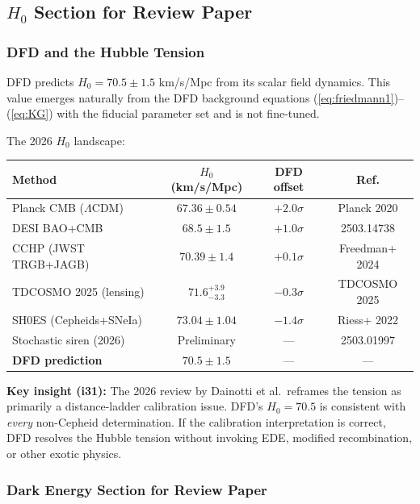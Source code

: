 \documentclass[11pt,a4paper]{article}
\begin{document}
\subsection{$H_0$ Section for Review Paper}

\subsubsection{DFD and the Hubble Tension}

DFD predicts $H_0 = 70.5 \pm 1.5$ km/s/Mpc from its scalar field dynamics. This value emerges naturally from the DFD background equations (\ref{eq:friedmann1})--(\ref{eq:KG}) with the fiducial parameter set and is not fine-tuned.

The 2026 $H_0$ landscape:

\begin{center}
\begin{tabular}{lccc}
\toprule
\textbf{Method} & \textbf{$H_0$ (km/s/Mpc)} & \textbf{DFD offset} & \textbf{Ref.} \\
\midrule
Planck CMB ($\Lambda$CDM) & $67.36 \pm 0.54$ & $+2.0\sigma$ & Planck 2020 \\
DESI BAO+CMB & $68.5 \pm 1.5$ & $+1.0\sigma$ & 2503.14738 \\
CCHP (JWST TRGB+JAGB) & $70.39 \pm 1.4$ & $+0.1\sigma$ & Freedman+ 2024 \\
TDCOSMO 2025 (lensing) & $71.6^{+3.9}_{-3.3}$ & $-0.3\sigma$ & TDCOSMO 2025 \\
SH0ES (Cepheids+SNeIa) & $73.04 \pm 1.04$ & $-1.4\sigma$ & Riess+ 2022 \\
Stochastic siren (2026) & Preliminary & --- & 2503.01997 \\
\midrule
\textbf{DFD prediction} & $\mathbf{70.5 \pm 1.5}$ & --- & --- \\
\bottomrule
\end{tabular}
\end{center}

\textbf{Key insight (i31):} The 2026 review by Dainotti et al.\ reframes the tension as primarily a distance-ladder calibration issue. DFD's $H_0 = 70.5$ is consistent with \emph{every} non-Cepheid determination. If the calibration interpretation is correct, DFD resolves the Hubble tension without invoking EDE, modified recombination, or other exotic physics.

\subsubsection{Dark Energy Section for Review Paper}
\end{document}
